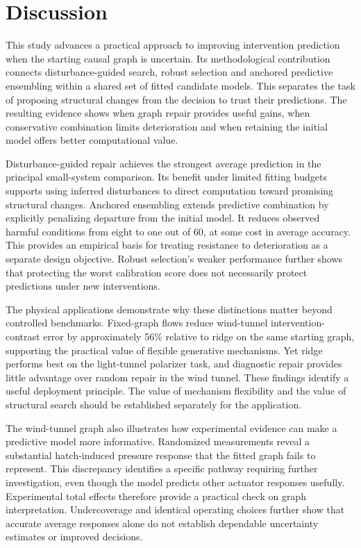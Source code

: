 \documentclass{svproc}
\begin{document}
\section{Discussion}
This study advances a practical approach to improving intervention prediction
when the starting causal graph is uncertain. Its methodological contribution
connects disturbance-guided search, robust selection and anchored predictive
ensembling within a shared set of fitted candidate models. This separates
the task of proposing structural changes from the decision to trust their
predictions. The resulting evidence shows when graph repair provides useful
gains, when conservative combination limits deterioration and when retaining
the initial model offers better computational value.

Disturbance-guided repair achieves the strongest average prediction in the
principal small-system comparison. Its benefit under limited fitting budgets
supports using inferred disturbances to direct computation toward promising
structural changes. Anchored ensembling extends predictive combination
\cite{gneiting2007,yao2018} by explicitly penalizing departure from the initial
model. It reduces observed harmful conditions from eight to one out of 60,
at some cost in average accuracy. This provides an empirical basis for treating
resistance to deterioration as a separate design objective. Robust selection's
weaker performance further shows that protecting the worst calibration score
does not necessarily protect predictions under new interventions.

The physical applications demonstrate why these distinctions matter beyond
controlled benchmarks. Fixed-graph flows reduce wind-tunnel intervention-contrast
error by approximately 56\% relative to ridge on the same starting graph,
supporting the practical value of flexible generative mechanisms. Yet ridge
performs best on the light-tunnel polarizer task, and diagnostic repair provides
little advantage over random repair in the wind tunnel. These findings identify
a useful deployment principle. The value of mechanism flexibility and the value
of structural search should be established separately for the application.

The wind-tunnel graph also illustrates how experimental evidence can make a
predictive model more informative. Randomized measurements reveal a substantial
hatch-induced pressure response that the fitted graph fails to represent.
This discrepancy identifies a specific pathway requiring further investigation,
even though the model predicts other actuator responses usefully. Experimental
total effects therefore provide a practical check on graph interpretation.
Undercoverage and identical operating choices further show that accurate
average responses alone do not establish dependable uncertainty estimates or
improved decisions.
\end{document}
